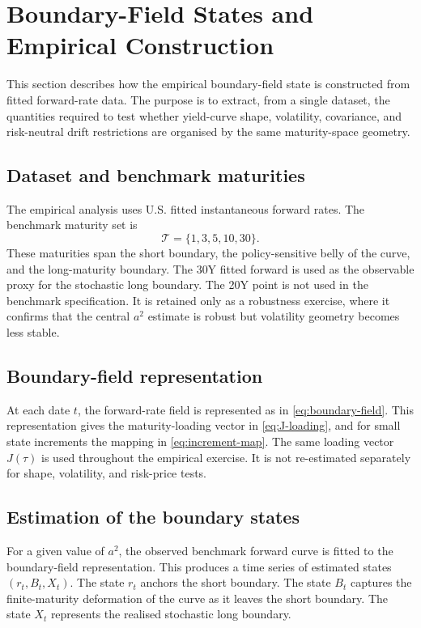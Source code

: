 \documentclass[11pt]{article}
\newcommand{\Tset}{\mathcal{T}}
\begin{document}
\section{Boundary-Field States and Empirical Construction}

This section describes how the empirical boundary-field state is constructed from fitted forward-rate data. The purpose is to extract, from a single dataset, the quantities required to test whether yield-curve shape, volatility, covariance, and risk-neutral drift restrictions are organised by the same maturity-space geometry.

\subsection{Dataset and benchmark maturities}

The empirical analysis uses U.S. fitted instantaneous forward rates. The benchmark maturity set is
\begin{equation}
  \Tset=\{1,3,5,10,30\}.
\end{equation}
These maturities span the short boundary, the policy-sensitive belly of the curve, and the long-maturity boundary. The 30Y fitted forward is used as the observable proxy for the stochastic long boundary. The 20Y point is not used in the benchmark specification. It is retained only as a robustness exercise, where it confirms that the central $a^2$ estimate is robust but volatility geometry becomes less stable.

\subsection{Boundary-field representation}

At each date $t$, the forward-rate field is represented as in \cref{eq:boundary-field}. This representation gives the maturity-loading vector in \cref{eq:J-loading}, and for small state increments the mapping in \cref{eq:increment-map}. The same loading vector $J(\tau)$ is used throughout the empirical exercise. It is not re-estimated separately for shape, volatility, and risk-price tests.

\subsection{Estimation of the boundary states}

For a given value of $a^2$, the observed benchmark forward curve is fitted to the boundary-field representation. This produces a time series of estimated states $(r_t,B_t,X_t)$. The state $r_t$ anchors the short boundary. The state $B_t$ captures the finite-maturity deformation of the curve as it leaves the short boundary. The state $X_t$ represents the realised stochastic long boundary.
\end{document}
